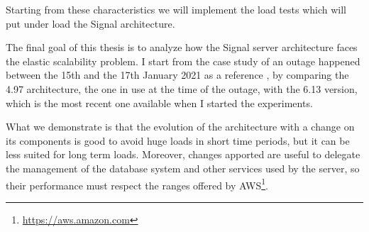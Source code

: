 Starting from these characteristics we will implement the load tests which will put under load the Signal architecture.

The final goal of this thesis is to analyze how the Signal server architecture \cite{read_2021,cocorada_2018} faces the elastic scalability problem.
I start from the case study of an outage happened between the 15th and the 17th January 2021 as a reference \cite{woodard_2021,aten_2021}, by comparing the 4.97 architecture, the one in use at the time of the outage, with the 6.13 version, which is the most recent one available when I started the experiments.

What we demonstrate is that the evolution of the architecture with a change on its components is good to avoid huge loads in short time periods, but it can be less suited for long term loads.
Moreover, changes apported are useful to delegate the management of the database system and other services used by the server, so their performance must respect the ranges offered by AWS\footnote{\url{https://aws.amazon.com}}.